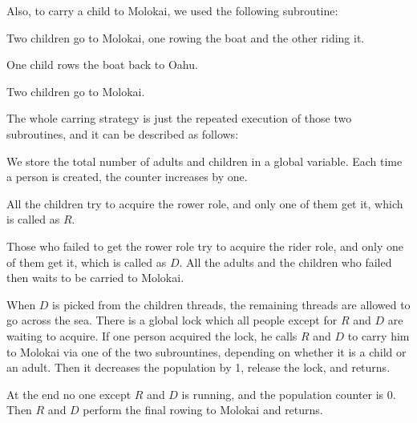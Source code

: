 \documentclass{article}
\begin{document}
\begin{spacing}{1.1}
Also, to carry a child to Molokai, we used the following subroutine:
\begin{asparaitem}
  \item Two children go to Molokai, one rowing the boat and the other riding it.\\
  \item One child rows the boat back to Oahu.\\
  \item Two children go to Molokai.\\
\end{asparaitem}

The whole carring strategy is just the repeated execution of those two subroutines, and it can be described as follows:

\begin{asparaitem}
  \item We store the total number of adults and children in a global variable. Each time a person is created, the counter increases by one.\\
  \item All the children try to acquire the rower role, and only one of them get it, which is called as $R$.\\
  \item Those who failed to get the rower role try to acquire the rider role, and only one of them get it, which is  called as $D$. All the adults and the children who failed then waits to be carried to Molokai.\\
  \item When $D$ is picked from the children threads, the remaining threads are allowed to go across the sea. There is a global lock which all people except for $R$ and $D$ are waiting to acquire. If one person acquired the lock, he calls $R$ and $D$ to carry him to Molokai via one of the two subrountines, depending on whether it is a child or an adult. Then it decreases the population by 1, release the lock, and returns.\\
  \item At the end no one except $R$ and $D$ is running, and the population counter is 0. Then $R$ and $D$ perform the final rowing to Molokai and returns.
\end{asparaitem}


\end{spacing}
\end{document}
